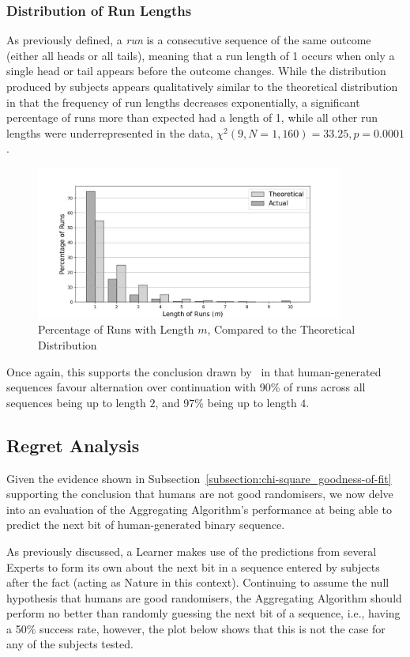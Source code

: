 \subsubsection{Distribution of Run Lengths}
As previously defined, a \textit{run} is a consecutive sequence of the same outcome (either all heads or all tails), meaning that a run length of 1 occurs when only a single head or tail appears before the outcome changes. While the distribution produced by subjects appears qualitatively similar to the theoretical distribution in that the frequency of run lengths decreases exponentially, a significant percentage of runs more than expected had a length of 1, while all other run lengths were underrepresented in the data, $\chi^2(9, N=1,160) = 33.25, p=0.0001$.

\begin{figure}[h]
    \centering
    \includegraphics[width=0.9\textwidth]{images/combined_length_of_runs.jpg}
    \caption{Percentage of Runs with Length $m$, Compared to the Theoretical Distribution}
\end{figure}

\noindent Once again, this supports the conclusion drawn by~\cite{bar-hillel:1991} in that human-generated sequences favour alternation over continuation with 90\% of runs across all sequences being up to length $2$, and 97\% being up to length $4$.


\subsection{Regret Analysis}
Given the evidence shown in Subsection~\ref{subsection:chi-square_goodness-of-fit} supporting the conclusion that humans are not good randomisers, we now delve into an evaluation of the Aggregating Algorithm's performance at being able to predict the next bit of human-generated binary sequence.

As previously discussed, a Learner makes use of the predictions from several Experts to form its own about the next bit in a sequence entered by subjects after the fact (acting as Nature in this context). Continuing to assume the null hypothesis that humans are good randomisers, the Aggregating Algorithm should perform no better than randomly guessing the next bit of a sequence, i.e., having a 50\% success rate, however, the plot below shows that this is not the case for any of the subjects tested.

